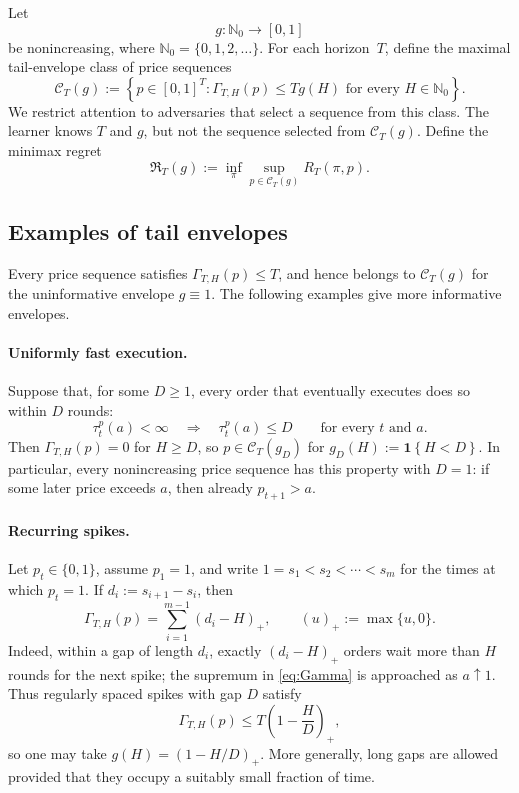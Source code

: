\documentclass[11pt]{article}
\theoremstyle{remark}
\newcommand{\ind}[1]{\mathbf{1}\!\left\{#1\right\}}
\newcommand{\N}{\mathbb{N}}
\newcommand{\C}{\mathcal{C}}
\newcommand{\Reg}{\mathfrak{R}}
\newcommand{\Tau}{\tau}
\newcommand{\GammaTail}{\Gamma}
\begin{document}
Let
\[
    g:\N_0\longrightarrow[0,1]
\]
be nonincreasing, where $\N_0=\{0,1,2,\ldots\}$.  For each horizon~$T$, define
the maximal tail-envelope class of price sequences
\begin{equation}\label{eq:class}
    \C_T(g)
    :=
    \left\{
        p\in[0,1]^T:
        \GammaTail_{T,H}(p)\le T g(H)
        \text{ for every }H\in\N_0
    \right\}.
\end{equation}
We restrict attention to adversaries that select a sequence from this class.
The learner knows $T$ and $g$, but not the sequence selected from $\C_T(g)$.
Define the minimax regret
\begin{equation}\label{eq:minimax}
    \Reg_T(g)
    :=
    \inf_{\pi}
    \sup_{p\in\C_T(g)}R_T(\pi,p).
\end{equation}

\subsection*{Examples of tail envelopes}

Every price sequence satisfies $\GammaTail_{T,H}(p)\le T$, and hence belongs
to $\C_T(g)$ for the uninformative envelope $g\equiv 1$.  The following
examples give more informative envelopes.

\paragraph{Uniformly fast execution.}
Suppose that, for some $D\ge 1$, every order that eventually executes does so
within $D$ rounds:
\[
    \Tau_t^p(a)<\infty
    \quad\Longrightarrow\quad
    \Tau_t^p(a)\le D
    \qquad\text{for every $t$ and $a$.}
\]
Then $\GammaTail_{T,H}(p)=0$ for $H\ge D$, so $p\in\C_T(g_D)$ for
$g_D(H):=\ind{H<D}$.  In particular, every nonincreasing price sequence has
this property with $D=1$: if some later price exceeds $a$, then already
$p_{t+1}>a$.

\paragraph{Recurring spikes.}
Let $p_t\in\{0,1\}$, assume $p_1=1$, and write
$1=s_1<s_2<\cdots<s_m$ for the times at which $p_t=1$.  If
$d_i:=s_{i+1}-s_i$, then
\[
    \GammaTail_{T,H}(p)
    =
    \sum_{i=1}^{m-1}(d_i-H)_+,
    \qquad
    (u)_+:=\max\{u,0\}.
\]
Indeed, within a gap of length $d_i$, exactly $(d_i-H)_+$ orders wait more
than $H$ rounds for the next spike; the supremum in \eqref{eq:Gamma} is
approached as $a\uparrow 1$.  Thus regularly spaced spikes with gap $D$
satisfy
\[
    \GammaTail_{T,H}(p)
    \le
    T\left(1-\frac{H}{D}\right)_+,
\]
so one may take $g(H)=(1-H/D)_+$.  More generally, long gaps are allowed
provided that they occupy a suitably small fraction of time.
\end{document}
